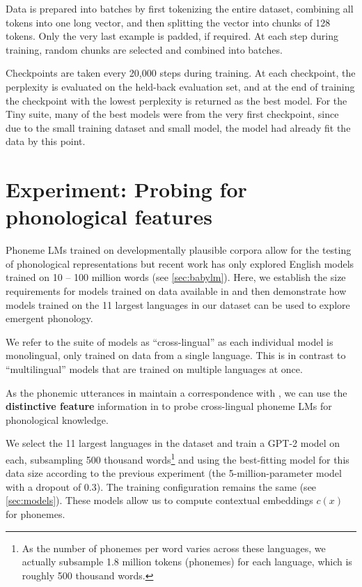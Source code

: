Data is prepared into batches by first tokenizing the entire dataset, combining all tokens into one long vector, and then splitting the vector into chunks of 128 tokens. Only the very last example is padded, if required. At each step during training, random chunks are selected and combined into batches. 

Checkpoints are taken every 20,000 steps during training. At each checkpoint, the perplexity is evaluated on the held-back evaluation set, and at the end of training the checkpoint with the lowest perplexity is returned as the best model. For the Tiny suite, many of the best models were from the very first checkpoint, since due to the small training dataset and small model, the model had already fit the data by this point.

\section{Experiment: Probing for phonological features}\label{sec:featureprobing}

Phoneme LMs trained on developmentally plausible corpora allow for the testing of phonological representations but recent work has only explored English models trained on 10 -- 100 million words (see \cref{sec:babylm}). Here, we establish the size requirements for models trained on data available in \ipachildes and then demonstrate how models trained on the 11 largest languages in our dataset can be used to explore emergent phonology.

We refer to the suite of models as ``cross-lingual'' as each individual model is monolingual, only trained on data from a single language. This is in contrast to ``multilingual'' models that are trained on multiple languages at once.

As the phonemic utterances in \ipachildes maintain a correspondence with \phoible, we can use the \textbf{distinctive feature} information in \phoible to probe cross-lingual phoneme LMs for phonological knowledge. 

We select the 11 largest languages in the dataset and train a GPT-2 model on each, subsampling 500 thousand words\footnote{As the number of phonemes per word varies across these languages, we actually subsample 1.8 million tokens (phonemes) for each language, which is roughly 500 thousand words.} and using the best-fitting model for this data size according to the previous experiment (the 5-million-parameter model with a dropout of 0.3). The training configuration remains the same (see \cref{sec:models}). These models allow us to compute contextual embeddings $c(x)$ for phonemes.

